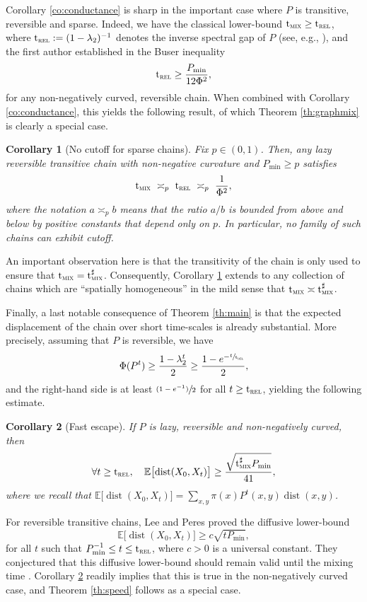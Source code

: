 \documentclass[10pt]{amsart}
\newcommand{\psfrac}[2]{\sfrac{(#1)}{#2}}
\newtheorem{corollary}{Corollary}
\theoremstyle{definition}
\newcommand{\EE}{{\mathbb{E}}}
\newcommand{\trel}{\mathrm{t}_{\textup{\textsc{rel}}}}
\newcommand{\tmix}{\mathrm{t}_{\textup{\textsc{mix}}}}
\newcommand{\pmin}{P_{\mathrm{min}}}
\DeclareMathOperator{\dist}{dist}
\begin{document}
Corollary \ref{co:conductance} is sharp in the important case where $P$ is transitive, reversible and sparse. Indeed, we have the classical lower-bound $\tmix\ge\trel$, where $\trel:=(1-\lambda_2)^{-1}$ denotes the inverse spectral gap of $P$ (see, e.g., \cite{MR3726904}), and the first author established in \cite{munch2019non} the Buser inequality
\begin{equation*}
\trel \ge \frac{\pmin}{12\Phi^2},
\end{equation*}
for any non-negatively curved, reversible chain. When combined with Corollary \ref{co:conductance}, this yields the following result, of which Theorem \ref{th:graphmix} is clearly a special case.
\begin{corollary}[No cutoff for sparse chains]\label{co:cutoff}Fix $p\in(0,1)$. Then, any lazy reversible transitive chain with non-negative curvature and $\pmin\ge p$ satisfies
\begin{equation*}
\tmix \ \asymp_p \ \trel \ \asymp_p \ \frac{1}{\Phi^2},
\end{equation*}
where the notation $a\asymp_p b$ means that the ratio $a/b$ is bounded from above and below by positive constants that depend only on $p$. In particular, no family of such chains can exhibit cutoff.
\end{corollary}
An important observation here is that the transitivity of the chain is only used to ensure that $\tmix=\tmix^\sharp$. Consequently, Corollary \ref{co:cutoff} extends to any collection of chains which are ``spatially homogeneous'' in the mild sense that $\tmix\asymp\tmix^\sharp$.

Finally, a last notable consequence of Theorem \ref{th:main} is that the expected displacement of the chain over short time-scales is already substantial. More precisely, assuming that $P$ is reversible, we have
\begin{equation*}
\Phi(P^t) \ge \frac{1-\lambda_2^t}{2}\ge \frac{1-e^{-\sfrac{t}{\trel}}}{2},
\end{equation*}
and the right-hand side is at least $\psfrac{1-e^{-1}}{2}$ for all $t\ge \trel$, yielding the following estimate.

\begin{corollary}[Fast escape]\label{co:escape}If $P$ is lazy, reversible and non-negatively curved, then
\begin{equation*}
\forall t\ge\trel,\quad \EE \bigl[\dist(X_0,X_t) \bigr] \ge \frac{\sqrt{\tmix^\sharp\pmin}}{41},
\end{equation*}
where we recall that $\EE \bigl[\dist(X_0,X_t) \bigr]=\sum_{x,y}\pi(x)P^t(x,y)\dist(x,y)$.
\end{corollary}
For reversible transitive chains, Lee and Peres \cite{MR3127886} proved the diffusive lower-bound
\begin{equation*}
\EE \bigl[\dist(X_0,X_t) \bigr] \ge c\sqrt{t\pmin},
\end{equation*} for all $t$ such that $\pmin^{-1}\le t\le \trel$, where $c>0$ is a universal constant. They conjectured that this diffusive lower-bound should remain valid until the mixing time \cite[Conj.\,2.5]{MR3127886}. Corollary \ref{co:escape} readily implies that this is true in the non-negatively curved case, and Theorem \ref{th:speed} follows as a special case.
\end{document}
